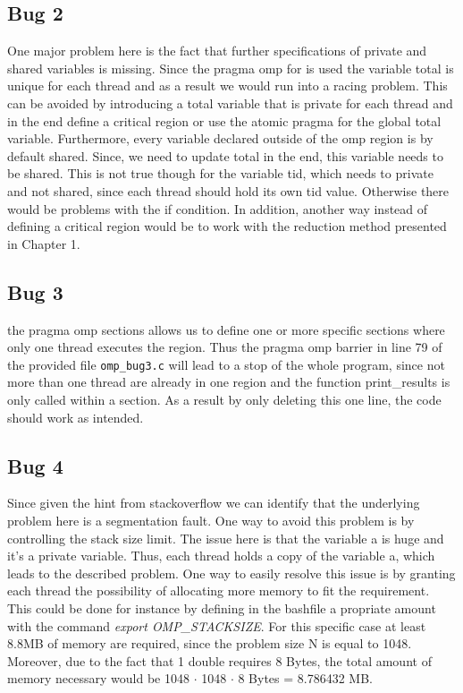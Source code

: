 \documentclass[unicode,11pt,a4paper,oneside,numbers=endperiod,openany]{scrartcl}
\begin{document}
\subsection{Bug 2}
\indent
One major problem here is the fact that further specifications of private and shared variables is missing. Since the pragma omp for is 
used the variable total is unique for each thread and as a result we would run into a racing problem. This can be avoided by introducing 
a total variable that is private for each thread and in the end define a critical region or use the atomic pragma for the global total 
variable. Furthermore, every variable declared outside of the omp region is by default shared. Since, we need to update total in the end, 
this variable needs to be shared. This is not true though for the variable tid, which needs to private and not shared, since each thread 
should hold its own tid value. Otherwise there would be problems with the if condition. In addition, another way instead of defining a 
critical region would be to work with the reduction method presented in Chapter 1.

\subsection{Bug 3}
\indent
the pragma omp sections allows us to define one or more specific sections where only one thread executes the region. Thus the pragma omp barrier 
in line 79 of the provided file \texttt{omp\_bug3.c} will lead to a stop of the whole program, since not more than one thread are already in one region 
and the function print\_results is only called within a section. As a result by only deleting this one line, the code should work as intended.

\subsection{Bug 4}
\indent
Since given the hint from stackoverflow we can identify that the underlying problem here is a segmentation fault. One way to avoid this problem 
is by controlling the stack size limit. The issue here is that the variable a is huge and it's a private variable. Thus, each thread holds a copy 
of the variable a, which leads to the described problem. One way to easily resolve this issue is by granting each thread the possibility of allocating 
more memory to fit the requirement. This could be done for instance by defining in the bashfile a propriate amount with the command \textit{export OMP\_STACKSIZE}. 
For this specific case at least 8.8MB of memory are required, since the problem size N is equal to 1048. Moreover, due to the fact that 1 double requires 8 Bytes, 
the total amount of memory necessary would be 1048 $\cdot$ 1048 $\cdot$ 8 Bytes = 8.786432 MB. 
\end{document}
